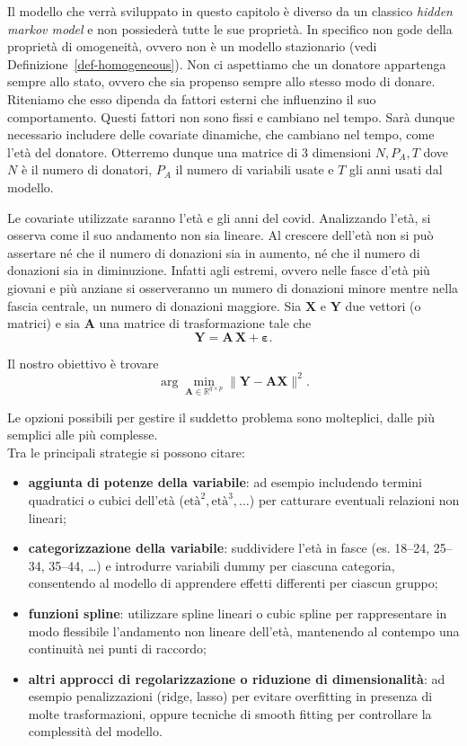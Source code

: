 \documentclass[
  italian,
  a4paper,
  a4paper,
  twoside,
  open=right,
  12pt]{scrbook}
\theoremstyle{definition}
\theoremstyle{remark}
\begin{document}
Il modello che verrà sviluppato in questo capitolo è diverso da un
classico \emph{hidden markov model} e non possiederà tutte le sue
proprietà. In specifico non gode della proprietà di omogeneità, ovvero
non è un modello stazionario (vedi Definizione~\ref{def-homogeneous}).
Non ci aspettiamo che un donatore appartenga sempre allo stato, ovvero
che sia propenso sempre allo stesso modo di donare. Riteniamo che esso
dipenda da fattori esterni che influenzino il suo comportamento. Questi
fattori non sono fissi e cambiano nel tempo. Sarà dunque necessario
includere delle covariate dinamiche, che cambiano nel tempo, come l'età
del donatore. Otterremo dunque una matrice di 3 dimensioni \(N, P_A, T\)
dove \(N\) è il numero di donatori, \(P_A\) il numero di variabili usate
e \(T\) gli anni usati dal modello.

Le covariate utilizzate saranno l'età e gli anni del covid. Analizzando
l'età, si osserva come il suo andamento non sia lineare. Al crescere
dell'età non si può assertare né che il numero di donazioni sia in
aumento, né che il numero di donazioni sia in diminuzione. Infatti agli
estremi, ovvero nelle fasce d'età più giovani e più anziane si
osserveranno un numero di donazioni minore mentre nella fascia centrale,
un numero di donazioni maggiore. Sia \(\mathbf{X}\) e \(\mathbf{Y}\) due
vettori (o matrici) e sia \(\mathbf{A}\) una matrice di trasformazione
tale che \[
\mathbf{Y} = \mathbf{A}\,\mathbf{X} + \boldsymbol{\varepsilon}.
\]

Il nostro obiettivo è trovare \[
\arg\min_{\mathbf{A}\in\mathbb{R}^{q\times p}}   \|\mathbf{Y}-\mathbf{A}\mathbf{X}\|^2.
\]

Le opzioni possibili per gestire il suddetto problema sono molteplici,
dalle più semplici alle più complesse.\\
Tra le principali strategie si possono citare:

\begin{itemize}
\item
  \textbf{aggiunta di potenze della variabile}: ad esempio includendo
  termini quadratici o cubici dell'età
  (\(\text{età}^2, \text{età}^3, \dots\)) per catturare eventuali
  relazioni non lineari;
\item
  \textbf{categorizzazione della variabile}: suddividere l'età in fasce
  (es. 18--24, 25--34, 35--44, \ldots) e introdurre variabili dummy per
  ciascuna categoria, consentendo al modello di apprendere effetti
  differenti per ciascun gruppo;
\item
  \textbf{funzioni spline}: utilizzare spline lineari o cubic spline per
  rappresentare in modo flessibile l'andamento non lineare dell'età,
  mantenendo al contempo una continuità nei punti di raccordo;
\item
  \textbf{altri approcci di regolarizzazione o riduzione di
  dimensionalità}: ad esempio penalizzazioni (ridge, lasso) per evitare
  overfitting in presenza di molte trasformazioni, oppure tecniche di
  smooth fitting per controllare la complessità del modello.
\end{itemize}
\end{document}
